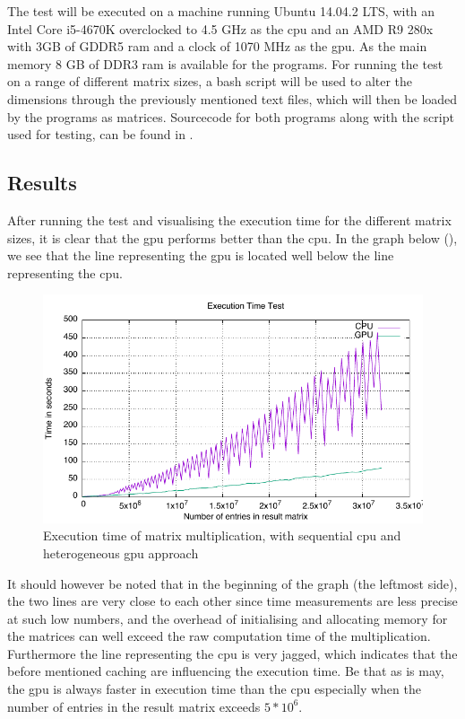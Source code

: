 The test will be executed on a machine running Ubuntu 14.04.2 LTS, with an Intel Core i5-4670K overclocked to 4.5 GHz as the \gls{cpu} and an AMD R9 280x with 3GB of GDDR5 ram and a clock of 1070 MHz as the \gls{gpu}.
As the main memory 8 GB of DDR3 ram is available for the programs.
For running the test on a range of different matrix sizes, a bash script will be used to alter the dimensions through the previously mentioned text files, which will then be loaded by the programs as matrices.
Sourcecode for both programs along with the script used for testing, can be found in .

\subsection{Results} %
\label{sub:results}
After running the test and visualising the execution time for the different matrix sizes, it is clear that the \gls{gpu} performs better than the \gls{cpu}.
In the graph below (), we see that the line representing the \gls{gpu} is located well below the line representing the \gls{cpu}.   
\begin{figure}[h!]
    \centering
    \includegraphics{figures/tests/graph.pdf}
    \caption{Execution time of matrix multiplication, with sequential \gls{cpu} and heterogeneous \gls{gpu} approach}\label{fig:test_results}
\end{figure} 
It should however be noted that in the beginning of the graph (the leftmost side), the two lines are very close to each other since time measurements are less precise at such low numbers, and the overhead of initialising and allocating memory for the matrices can well exceed the raw computation time of the multiplication.     
Furthermore the line representing the \gls{cpu} is very jagged, which indicates that the before mentioned caching are influencing the execution time.
Be that as is may, the \gls{gpu} is always faster in execution time than the \gls{cpu} especially when the number of entries in the result matrix exceeds $5*10^6$.



